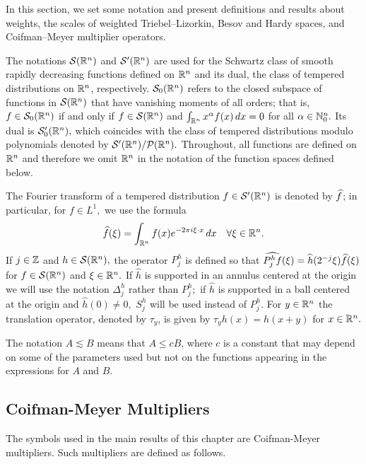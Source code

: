 In this section, we set some notation and present definitions and  results about weights, the scales of weighted Triebel--Lizorkin, Besov and Hardy spaces, and Coifman--Meyer multiplier operators.

The notations ${\mathcal{S}}({{\mathbb R}^n})$ and ${\mathcal{S}'}({{\mathbb R}^n})$ are used for the Schwartz class of smooth rapidly decreasing functions defined on ${{\mathbb R}^n}$ and its dual, the class of tempered distributions on ${{\mathbb R}^n}$, respectively. ${\mathcal{S}_0}({{\mathbb R}^n})$ refers to the closed subspace of functions in ${\mathcal{S}}({{\mathbb R}^n})$ that have vanishing moments of all orders; that is, $f\in {\mathcal{S}_0}({{\mathbb R}^n})$ if and only if $f\in {\mathcal{S}}({{\mathbb R}^n})$ and $\int_{{{\mathbb R}^n}}x^\alpha f(x)\,dx=0$ for all $\alpha\in \mathbb{N}_0^n.$ Its dual is  $\mathcal{S}'_0({{\mathbb R}^n}),$  which coincides with the class of tempered distributions modulo polynomials denoted by ${\mathcal{S}'}({{\mathbb R}^n})/\mathcal{P}({{\mathbb R}^n}).$ Throughout, all functions are defined on ${{\mathbb R}^n}$ and therefore we omit ${{\mathbb R}^n}$ in the notation of the  function spaces defined below. 

The Fourier transform of a tempered distribution $f\in{\mathcal{S}'}({{\mathbb R}^n})$ is denoted by   $\widehat{f}$; in particular, for $f\in L^1,$ we use the formula
\begin{equation*}
\widehat{f}(\xi)= \int_{{{\mathbb R}^n}} f(x) e^{-2\pi i \xi\cdot x} \, dx\quad \forall \xi\in{{\mathbb R}^n}.
\end{equation*}
If $j\in \mathbb{Z}$ and  $h\in {\mathcal{S}}({{\mathbb R}^n}),$ the operator $P_j^h$ is defined so that $\widehat{P_j^h f}(\xi)=\widehat{h}(2^{-j}\xi)\widehat{f}(\xi)$ for $f\in {\mathcal{S}}({{\mathbb R}^n})$ and $\xi\in {{\mathbb R}^n}.$  If $\widehat{h}$ is supported in an annulus centered at the origin we will use the notation $\Delta_j^h$ rather than $P_j^h;$ if  $\widehat{h}$ is supported in a ball centered at the origin and $\widehat{h}(0)\neq 0,$   $S_j^h$ will be used instead of  $P_j^h.$
For $y\in{{\mathbb R}^n}$ the translation operator, denoted by $\tau_y$, is given by $\tau_y h(x)=h(x+y)$ for  $x\in{{\mathbb R}^n}.$ 

The notation $A \lesssim B$ means that $A \leq c B$, where $c$ is a constant that may depend on some of the parameters used but not on the functions appearing in the expressions for $A$ and $B$. 
 
\subsection{Coifman-Meyer Multipliers}\label{Coifman-Meyer Multipliers}

The symbols used in the main results of this chapter are Coifman-Meyer multipliers. Such multipliers are defined as follows.

